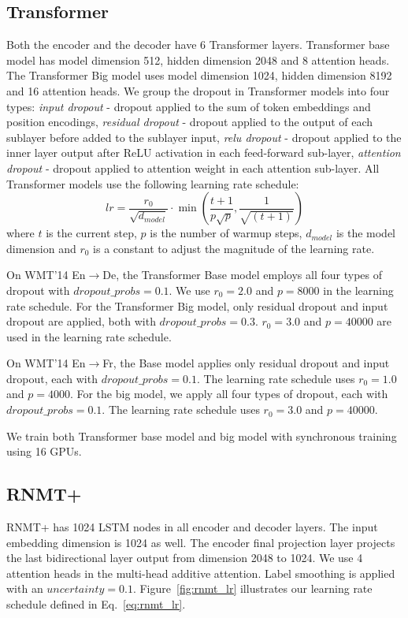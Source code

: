 \documentclass[11pt,a4paper]{article}
\begin{document}
\subsection{Transformer}

Both the encoder and the decoder have 6 Transformer layers. Transformer base
model has model dimension 512, hidden dimension 2048 and 8 attention heads.
The Transformer Big model uses model dimension 1024, hidden dimension
8192 and 16
attention heads. We group the dropout in Transformer models into four types:
\textit{input dropout} - dropout applied to the sum of token embeddings and
position encodings, \textit{residual dropout} - dropout applied to the output
of each sublayer before added to the sublayer input, \textit{relu dropout} -
dropout applied to the inner layer output after ReLU activation in each
feed-forward sub-layer, \textit{attention dropout} - dropout applied to
attention weight in each attention sub-layer. All Transformer models
use the following learning rate schedule:
\begin{equation}
  lr = \frac{r_0}{\sqrt{d_{model}}} \cdot\min\left( \frac{t+1}{p \sqrt{p}}, \frac{1}{\sqrt{(t+1)}}\right)
\label{eq:trans_lr}
\end{equation}
where $t$ is the current step, $p$ is the number of warmup steps, $d_{model}$
is the model dimension and $r_0$ is a constant to adjust the magnitude of the
learning rate.

On WMT'14 En$\rightarrow$De, the Transformer Base model employs all
four types of dropout with $dropout\_probs=0.1$. We use
$r_0=2.0$ and $p=8000$ in the learning rate schedule. For
the Transformer Big model, only residual dropout and input dropout are
applied, both with $dropout\_probs=0.3$. $r_0=3.0$ and $p=40000$
are used in the learning rate schedule.

On WMT'14 En$\rightarrow$Fr, the Base model applies only residual dropout and
input dropout, each with $dropout\_probs=0.1$. The learning rate
schedule uses $r_0=1.0$ and $p=4000$. For the big model, we apply all four
types of dropout, each with $dropout\_probs=0.1$. The learning rate schedule
uses $r_0=3.0$ and $p=40000$.

We train both Transformer base model and big model with synchronous training using 16 GPUs.

\subsection{RNMT+}

RNMT+ has 1024 LSTM nodes in all encoder and decoder layers. The input
embedding dimension is 1024 as well. The encoder final projection layer
projects the last bidirectional layer output from dimension 2048 to 1024. We
use 4 attention heads in the multi-head additive attention. Label smoothing is
applied with an $uncertainty=0.1$. Figure~\ref{fig:rnmt_lr} illustrates our
learning rate schedule defined in Eq.~\ref{eq:rnmt_lr}.
\end{document}
